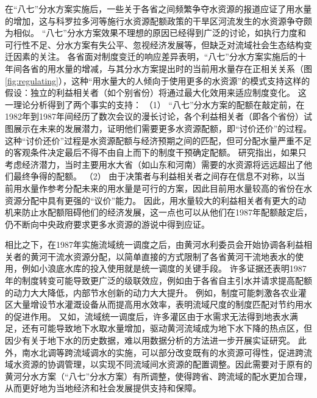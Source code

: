 在``八七''分水方案实施后，一些关于各省之间频繁争夺水资源的报道应证了用水量的增加，这与科罗拉多河等施行水资源配额政策的干旱区河流发生的水资源争夺颇为相似\cite{grafton2013, schmandt2021a}。
``八七''分水方案效果不理想的原因已经得到广泛的讨论，如执行力度和可行性不足、分水方案有失公平、忽视经济发展等，但缺乏对流域社会\textendash{}生态结构变迁因素的关注\cite{wang2019b,wang2019a}。
各省面对制度变迁的响应差异表明，``八七''分水方案实施后的十年间各省的用水量的增减，与其分水方案提出时的当前用水量存在正相关关系（图\ref{fig:regulating}），这种“用水量大的人倾向于使用更多的水资源”的模式支持这样的假设：独立的利益相关者（如个别省份）将通过最大化效用来适应制度变化。
这一理论分析得到了两个事实的支持：
（1） ``八七''分水方案的配额在敲定前，在1982年到1987年间经历了数次会议的漫长讨论，各个利益相关者（即各个省份）试图展示在未来的发展潜力，证明他们需要更多水资源配额，即“讨价还价”的过程\cite{wang2019a, wang2019b}。
这种“讨价还价”过程是水资源配额与经济预期之间的匹配，但可分配水量严重不足的客观条件决定最后不得不由自上而下的制度干预确定配额。
研究指出，如果只考虑经济潜力，当时主要用水大省（如山东和河南）需要的水资源将远远超出了他们最终争得的配额\cite{zuo2020}。
（2） 由于决策者与利益相关者之间存在信息不对称，以当前用水量作参考分配未来的用水量是可行的方案，因此目前用水量较高的省份在水资源分配中具有更强的“议价”能力。
因此，用水量较大的利益相关者有更大的动机来防止水配额阻碍他们的经济发展，这一点也可以从他们在1987年配额敲定后，仍不断向中央政府要求更多水资源的游说中得到应证\cite{wang2019a, wang2019b}。


相比之下，在1987年实施流域统一调度之后，由黄河水利委员会开始协调各利益相关者的黄河干流水资源分配，以简单直接的方式限制了各省黄河干流地表水的使用，例如小浪底水库的投入使用就是统一调度的关键手段。
许多证据还表明1987年的制度转变可能导致更广泛的级联效应，例如由于各省自主引水并请求提高配额的动力大大降低，内部节水创新的动力大大提升。
例如，制度可能刺激各农业灌区大量增设节水灌溉设备从而提高用水效率，表明流域尺度的制度匹配对节约用水的促进作用\cite{krieger1955, ostrom1990}。
又如，流域统一调度后，许多灌区由于水需求无法得到地表水满足，还有可能导致地下水取水量增加，驱动黄河流域成为地下水下降的热点区\cite{sun2022}，但因少有关于地下水的历史数据，难以用数据分析的方法进一步开展实证研究。
此外，南水北调等跨流域调水的实施，可以部分改变既有的水资源可得性，促进跨流域水资源的协调管理，以实现不同流域间水资源的配置调整。因此需要对于原有的黄河分水方案（``八七''分水方案）有所调整，使得跨省、跨流域的配水更加合理，从而更好地为当地经济和社会发展提供支持和保障。

